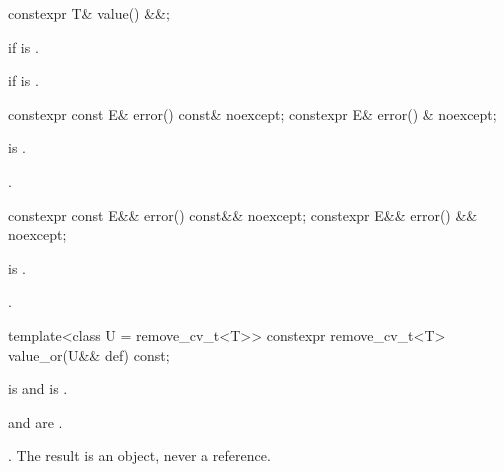 %
\begin{itemdecl}
constexpr T& value() &&;
\end{itemdecl}

\begin{itemdescr}
\pnum
\returns
{} if  is .

\pnum
\throws
{} if  is .
\end{itemdescr}

%
\begin{itemdecl}
constexpr const E& error() const& noexcept;
constexpr E& error() & noexcept;
\end{itemdecl}

\begin{itemdescr}
\pnum
\expects
{} is .

\pnum
\returns
{}.
\end{itemdescr}

%
\begin{itemdecl}
constexpr const E&& error() const&& noexcept;
constexpr E&& error() && noexcept;
\end{itemdecl}

\begin{itemdescr}
\pnum
\expects
{} is .

\pnum
\returns
{}.
\end{itemdescr}

%
\begin{itemdecl}
template<class U = remove_cv_t<T>>
  constexpr remove_cv_t<T> value_or(U&& def) const;
\end{itemdecl}

\begin{itemdescr}
\pnum
\constraints
{} is  and  is .

\pnum
\mandates
{} and  are .

\pnum
\returns
{}. The result is an object, never a reference.
\end{itemdescr}

